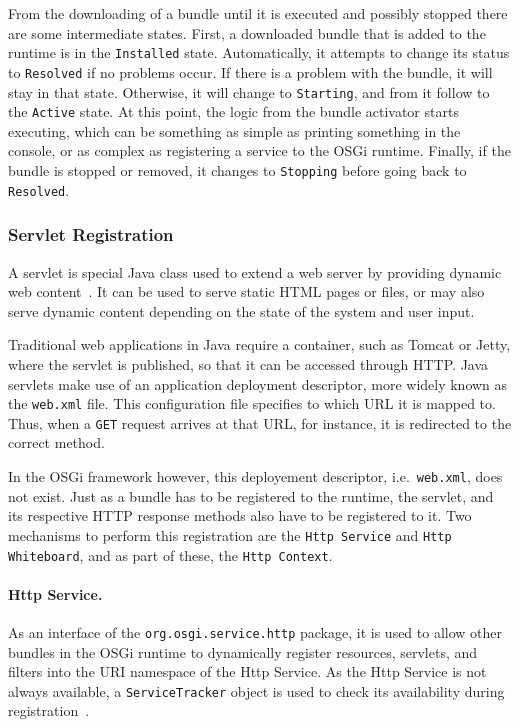 \documentclass[12pt]{article}
\begin{document}
From the downloading of a bundle until it is executed and possibly stopped there are some intermediate states. First, a downloaded bundle that is added to the runtime is in the \texttt{Installed} state. Automatically, it attempts to change its status to \texttt{Resolved} if no problems occur. If there is a problem with the bundle, it will stay in that state. Otherwise, it will change to \texttt{Starting}, and from it follow to the \texttt{Active} state. At this point, the logic from the bundle activator starts executing, which can be something as simple as printing something in the console, or as complex as registering a service to the OSGi runtime. Finally, if the bundle is stopped or removed, it changes to \texttt{Stopping} before going back to \texttt{Resolved}.

\subsubsection{Servlet Registration}

A servlet is special Java class used to extend a web server by providing dynamic web content~\cite{servlet}. It can be used to serve static HTML pages or files, or may also serve dynamic content depending on the state of the system and user input.

Traditional web applications in Java require a container, such as Tomcat or Jetty, where the servlet is published, so that it can be accessed through HTTP. Java servlets make use of an application deployment descriptor, more widely known as the \texttt{web.xml} file. This configuration file specifies to which URL it is mapped to. Thus, when a \texttt{GET} request arrives at that URL, for instance, it is redirected to the correct method.

In the OSGi framework however, this deployement descriptor, i.e.\ \texttt{web.xml}, does not exist. Just as a bundle has to be registered to the runtime, the servlet, and its respective HTTP response methods also have to be registered to it. Two mechanisms to perform this registration are the \texttt{Http Service} and \texttt{Http Whiteboard}, and as part of these, the \texttt{Http Context}.

\paragraph{Http Service.} As an interface of the \texttt{org.osgi.service.http} package, it is used to allow other bundles in the OSGi runtime to dynamically register resources, servlets, and filters into the URI namespace of the Http Service. As the Http Service is not always available, a \texttt{ServiceTracker} object is used to check its availability during registration~\cite{httpservice}.
\end{document}
